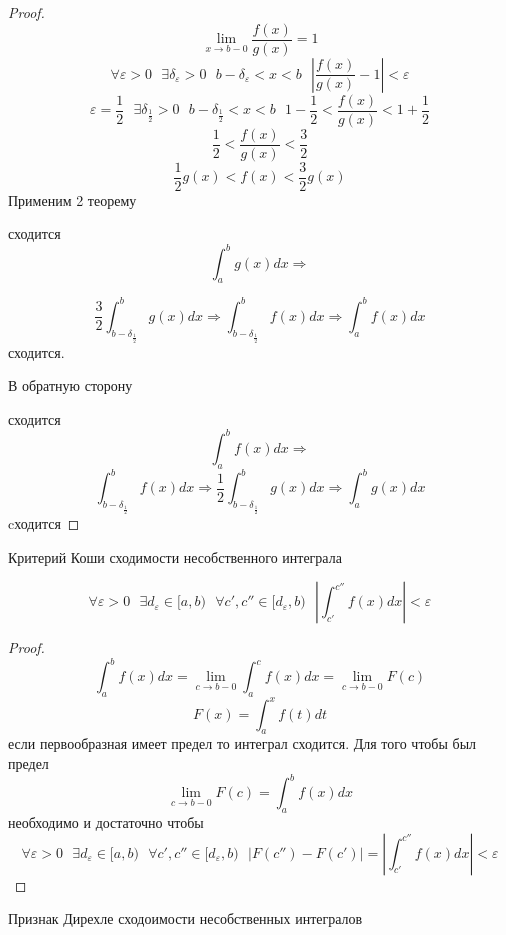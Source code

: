 \begin{proof}
  $$
  \lim_{x \to b-0} \frac{f(x)}{g(x)} = 1
  $$
  $$
  \forall \varepsilon > 0 ~~~ \exists \delta_{\varepsilon} > 0 ~~~
  b - \delta_{\varepsilon} < x < b ~~~ \left| \frac{f(x)}{g(x)} - 1 \right|
  < \varepsilon
  $$
  $$
  \varepsilon = \frac{1}{2} ~~~ \exists \delta_{\frac{1}{2}} > 0 ~~~
  b - \delta_{\frac{1}{2}} < x < b ~~~
  1 - \frac{1}{2} < \frac{f(x)}{g(x)} < 1 + \frac{1}{2}
  $$
  $$
  \frac{1}{2} < \frac{f(x)}{g(x)} < \frac{3}{2}
  $$
  $$
  \frac{1}{2} g(x) < f(x) < \frac{3}{2} g(x)
  $$
  Применим 2 теорему

  сходится
  $$
  \int_a^b g(x)dx \Rightarrow
  $$

  $$
  \frac{3}{2} \int_{b - \delta_{\frac{1}{2}}}^b g(x)dx \Rightarrow
  \int_{b - \delta_{\frac{1}{2}}}^b f(x)dx \Rightarrow
  \int_a^b f(x)dx
  $$
  сходится.

  В обратную сторону

  сходится
  $$
  \int_a^b f(x)dx \Rightarrow
  $$
  $$
  \int_{b - \delta_{\frac{1}{2}}}^b f(x)dx \Rightarrow
  \frac{1}{2} \int_{b - \delta_{\frac{1}{2}}}^b g(x)dx \Rightarrow
  \int_a^b g(x)dx
  $$
  cходится
\end{proof}

\begin{title}[\Large]
  Критерий Коши сходимости несобственного интеграла
\end{title}

\begin{block}
  $$
  \forall \varepsilon > 0 ~~~ \exists d_{\varepsilon} \in [a,b) ~~~
  \forall c', c'' \in [d_{\varepsilon}, b) ~~~
  \left| \int_{c'}^{c''} f(x)dx \right| < \varepsilon
  $$
\end{block}

\begin{proof}
  $$
  \int_a^b f(x)dx = \lim_{c \to b-0} \int_a^c f(x)dx = \lim_{c \to b-0} F(c)
  $$
  $$
  F(x) = \int_a^x f(t)dt
  $$
  если первообразная имеет предел то интеграл сходится. Для того чтобы был
  предел
  $$
  \lim_{c \to b-0} F(c) = \int_a^b f(x)dx
  $$
  необходимо и достаточно чтобы
  $$
  \forall \varepsilon > 0 ~~~ \exists d_{\varepsilon} \in [a,b) ~~~
  \forall c', c'' \in [d_{\varepsilon}, b) ~~~
  |F(c'') - F(c')| = \left|\int_{c'}^{c''} f(x) dx \right| < \varepsilon
  $$
\end{proof}

\begin{title}[\Large]
  Признак Дирехле сходоимости несобственных интегралов
\end{title}


